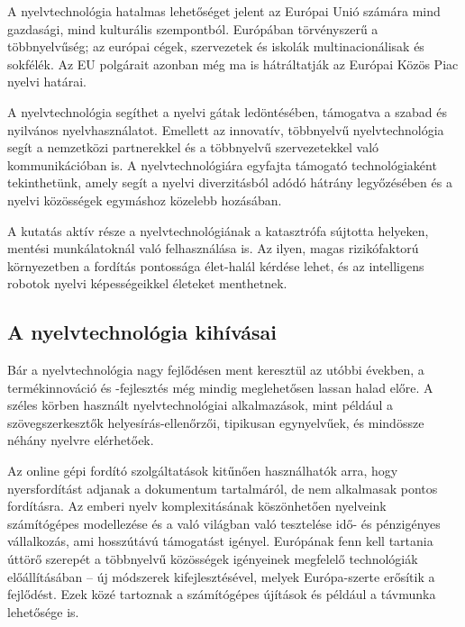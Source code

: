 \begin{multicols}{2}
  A nyelvtechnológia hatalmas lehetőséget jelent az Európai Unió számára mind gazdasági, mind kulturális szempontból. Európában törvényszerű a többnyelvűség; az európai cégek, szervezetek és iskolák multinacionálisak és sokfélék. Az EU polgárait azonban még ma is hátráltatják az Európai Közös Piac nyelvi határai.


  A nyelvtechnológia segíthet a nyelvi gátak ledöntésében, támogatva a szabad és nyilvános nyelvhasználatot. Emellett az innovatív, többnyelvű nyelvtechnológia segít a nemzetközi partnerekkel és a többnyelvű szervezetekkel való kommunikációban is. A nyelvtechnológiára egyfajta támogató technológiaként tekinthetünk, amely segít a nyelvi diverzitásból adódó hátrány legyőzésében és a nyelvi kö\-zös\-sé\-gek egymáshoz közelebb hozásában.

  A kutatás aktív része a nyelvtechnológiának a katasztrófa sújtotta helyeken, mentési munkálatoknál való felhasználása is. Az ilyen, magas rizikófaktorú kör\-nye\-zet\-ben a fordítás pontossága élet-halál kérdése lehet, és az intelligens robotok nyelvi képességeikkel életeket menthetnek. 

  \subsection{A nyelvtechnológia kihívásai}

  Bár a nyelvtechnológia nagy fejlődésen ment keresztül az utóbbi években, a termékinnováció és -fejlesztés még mindig meglehetősen lassan halad előre. A széles körben használt nyelvtechnológiai al\-kal\-ma\-zá\-sok, mint például a szö\-veg\-szer\-kesz\-tők helyesírás-ellenőrzői, tipikusan egynyelvűek, és mindössze néhány nyelvre elérhetőek.


  Az online gépi fordító szolgáltatások kitűnően használhatók arra, hogy nyersfordítást adjanak a dokumentum tartalmáról, de nem alkalmasak pontos fordításra. Az emberi nyelv komplexitásának köszönhetően nyelveink számítógépes modellezése és a való világban való tesz\-te\-lé\-se idő- és pénzigényes vállalkozás, ami hosszú\-tá\-vú támogatást igényel. Európának fenn kell tartania úttörő sze\-re\-pét a többnyelvű közösségek igényeinek megfelelő technológiák előállításában -- új módszerek kifejlesztésével, melyek Európa-szerte erősítik a fejlődést. Ezek közé tartoznak a számítógépes újítások és például a távmunka lehetősége is.


\end{multicols}
